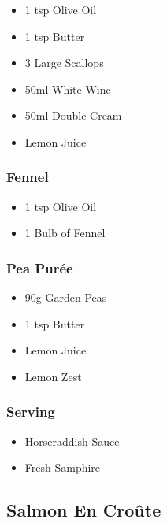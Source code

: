 \documentclass[11pt, english]{article}
\begin{document}
	\begin{itemize}
	\setlength\itemsep{0cm}
		\item 1 tsp Olive Oil
		\item 1 tsp Butter
		\item 3 Large Scallops
		\item 50ml White Wine
		\item 50ml Double Cream
		\item Lemon Juice
	\end{itemize}

		\subsubsection*{Fennel}

	\begin{itemize}
	\setlength\itemsep{0cm}
		\item 1 tsp Olive Oil
		\item 1 Bulb of Fennel
	\end{itemize}

		\subsubsection*{Pea Pur\'{e}e}

	\begin{itemize}
        \setlength\itemsep{0cm}
		\item 90g Garden Peas
		\item 1 tsp Butter
		\item Lemon Juice
		\item Lemon Zest		
        \end{itemize}

		\subsubsection*{Serving}

	\begin{itemize}
        \setlength\itemsep{0cm}
		\item Horseraddish Sauce
		\item Fresh Samphire
        \end{itemize}

\newpage

	\subsection{Salmon En Cro\^{u}te}
\end{document}
